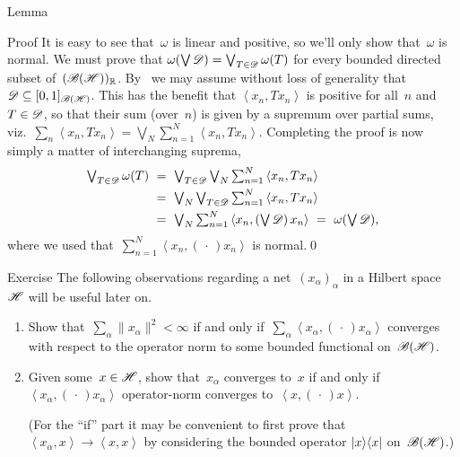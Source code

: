 \documentclass[a]{subfiles}
\begin{document}
\begin{parsec}
\begin{point}{Lemma}
\begin{point}{Proof}
It is easy to see that~$\omega$ is linear and positive,
so we'll only show that~$\omega$ is normal.
We must prove that $\omega(\bigvee \mathscr{D})=\bigvee_{T\in\mathscr{D}} \omega(T)$
for every bounded directed subset of~$(\mathscr{B}(\mathscr{H}))_{\mathbb{R}}$.
By~
we may assume without loss of generality that 
$\mathscr{D}\subseteq [0,1]_{\mathscr{B}(\mathscr{H})}$.
This has the benefit that $\left<x_n,T x_n\right>$
is positive for all~$n$ and~$T\in\mathscr{D}$,
so that their sum (over~$n$) is given by
a supremum over partial sums, viz.~$\sum_n\left<x_n,Tx_n\right>
=\bigvee_N\sum_{n=1}^N\left<x_n,Tx_n\right>$.
Completing the proof is now simply a matter of
interchanging suprema,
\begin{alignat*}{3}
	\textstyle \bigvee_{T\in \scrD} \omega(T)
	\ &=\ 
	\textstyle\bigvee_{T\in \scrD} \bigvee_N \sum_{n=1}^N 
	\left<x_n,Tx_n\right>\\
	\ &=\ 
	\textstyle\bigvee_N \bigvee_{T\in \scrD}\sum_{n=1}^N 
	\left<x_n,Tx_n\right>\\
	\ &=\ 
	\textstyle\bigvee_N \sum_{n=1}^N \left<x_n,(\bigvee \scrD )\,x_n\right>
	\ =\ \textstyle\omega(\bigvee\scrD),
\end{alignat*}
where we used that~$\sum_{n=1}^N \left<x_n,(\,\cdot\,)x_n\right>$
is normal.\qed
\end{point}
\end{point}
\begin{point}{Exercise}%
The following observations
regarding
a net~$(x_\alpha)_\alpha$ in a Hilbert space~$\mathscr{H}$
will be useful later on.
\begin{enumerate}
\item
Show that~$\sum_\alpha \|x_\alpha\|^2<\infty$
if and only if~$\sum_\alpha \left<x_\alpha,(\,\cdot\,)x_\alpha\right>$
converges with respect to the operator norm
to some bounded functional on~$\mathscr{B}(\mathscr{H})$.
\item
Given some~$x\in \mathscr{H}$,
show that~$x_\alpha$ converges to~$x$
if and only if  $\left<x_\alpha,(\,\cdot\,)x_\alpha\right>$
operator-norm converges to~$\left<x,(\,\cdot\,)x\right>$.

(For the ``if'' part it may be convenient
to first prove that $\left<x_\alpha,x\right>\to \left<x,x\right>$
by considering the bounded operator
$\left|x\right>\!\left<x\right|$ on~$\mathscr{B}(\mathscr{H})$.)

\end{enumerate}
\end{point}
\end{parsec}
\end{document}
